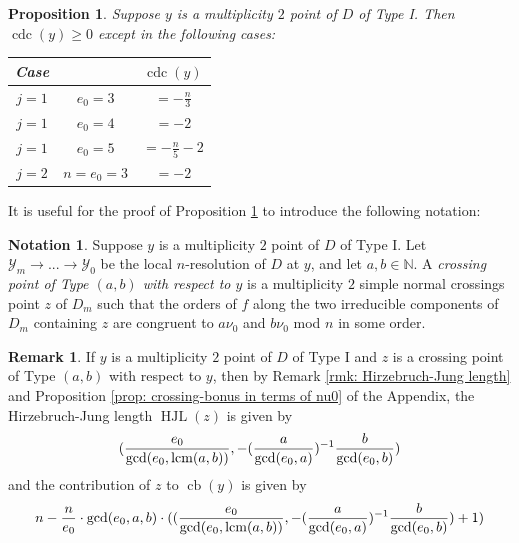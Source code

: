 \documentclass[12pt]{amsart}
\numberwithin{equation}{section}
\newtheorem{prop}[equation]{Proposition}
\theoremstyle{definition}
\newtheorem{remark}[equation]{Remark}
\newtheorem{notation}[equation]{Notation}
\newcommand{\N}{\mathbb N}
\newcommand{\Y}{\mathcal{Y}}
\let\L\relax
\DeclareMathOperator{\lcm}{lcm}
\DeclareMathOperator{\cb}{cb}
\DeclareMathOperator{\cdc}{cdc}
\DeclareMathOperator{\HJL}{HJL}
\DeclareMathOperator{\L}{L}
\begin{document}
\begin{prop}\label{prop: full positivity for type I}
    Suppose $y$ is a multiplicity $2$ point of $D$ of Type I. Then $\cdc(y)\geq0$ except in the following cases:
    \begin{table}[h!]
    \centering
    \renewcommand{\arraystretch}{1.4}
    \begin{tabular}{|cc|c|}
        \hline
         \textbf{\textup{Case}} &  & $\cdc(y)$ \\
        \hline
        $j=1$ & $e_0= 3$ & $=-\frac{n}{3}$ \\
        \hline
        $j=1$ & $e_0=4$ & $=-2$ \\
        \hline
        $j=1$ & $e_0=5$ & $=-\frac{n}{5}-2$ \\
        \hline
        $j=2$ & $n=e_0=3$ & $=-2$ \\
        \hline
    \end{tabular}
    \end{table} 
\end{prop}

It is useful for the proof of Proposition \ref{prop: full positivity for type I} to introduce the following notation:

\begin{notation}\label{notation: crossing of type (a,b)}
    Suppose $y$ is a multiplicity $2$ point of $D$ of Type I. Let $\Y_m\to...\to\Y_0$ be the local $n$-resolution of $D$ at $y$, and let $a,b\in\N$. A \textit{crossing point of Type $(a,b)$ with respect to $y$} is a multiplicity $2$ simple normal crossings point $z$ of $D_m$ such that the orders of $f$ along the two irreducible components of $D_m$ containing $z$ are congruent to $a\nu_0$ and $b\nu_0$ mod $n$ in some order.
\end{notation}

\begin{remark}\label{rmk: contribution of (a,b) crossing}
    If $y$ is a multiplicity $2$ point of $D$ of Type I and $z$ is a crossing point of Type $(a,b)$ with respect to $y$, then by Remark \ref{rmk: Hirzebruch-Jung length} and Proposition \ref{prop: crossing-bonus in terms of nu0} of the Appendix, the Hirzebruch-Jung length $\HJL(z)$ is given by
    \[\L(\frac{e_0}{\gcd(e_0,\lcm(a,b))},-(\frac{a}{\gcd(e_0,a)})^{-1}\frac{b}{\gcd(e_0,b)})\]
    and the contribution of $z$ to $\cb(y)$ is given by 
    \[n-\frac{n}{e_0}\cdot\gcd(e_0,a,b)\cdot(\L(\frac{e_0}{\gcd(e_0,\lcm(a,b))},-(\frac{a}{\gcd(e_0,a)})^{-1}\frac{b}{\gcd(e_0,b)})+1)\]
\end{remark}
\end{document}
